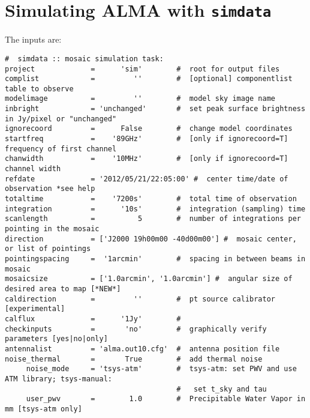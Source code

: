 
\section{Simulating ALMA with {\tt simdata}}
\label{section:sim.almasimmos}

The inputs are:
\small
\begin{verbatim}
#  simdata :: mosaic simulation task:
project             =      'sim'        #  root for output files
complist            =         ''        #  [optional] componentlist table to observe
modelimage          =         ''        #  model sky image name
inbright            = 'unchanged'       #  set peak surface brightness in Jy/pixel or "unchanged"
ignorecoord         =      False        #  change model coordinates
startfreq           =    '89GHz'        #  [only if ignorecoord=T] frequency of first channel
chanwidth           =    '10MHz'        #  [only if ignorecoord=T] channel width
refdate             = '2012/05/21/22:05:00' #  center time/date of observation *see help
totaltime           =    '7200s'        #  total time of observation
integration         =      '10s'        #  integration (sampling) time
scanlength          =          5        #  number of integrations per pointing in the mosaic
direction           = ['J2000 19h00m00 -40d00m00'] #  mosaic center, or list of pointings
pointingspacing     =  '1arcmin'        #  spacing in between beams in mosaic
mosaicsize          = ['1.0arcmin', '1.0arcmin'] #  angular size of desired area to map [*NEW*]
caldirection        =         ''        #  pt source calibrator [experimental]
calflux             =      '1Jy'        #
checkinputs         =       'no'        #  graphically verify parameters [yes|no|only]
antennalist         = 'alma.out10.cfg'  #  antenna position file
noise_thermal       =       True        #  add thermal noise
     noise_mode     = 'tsys-atm'        #  tsys-atm: set PWV and use ATM library; tsys-manual:
                                        #   set t_sky and tau
     user_pwv       =        1.0        #  Precipitable Water Vapor in mm [tsys-atm only]

\end{verbatim}
